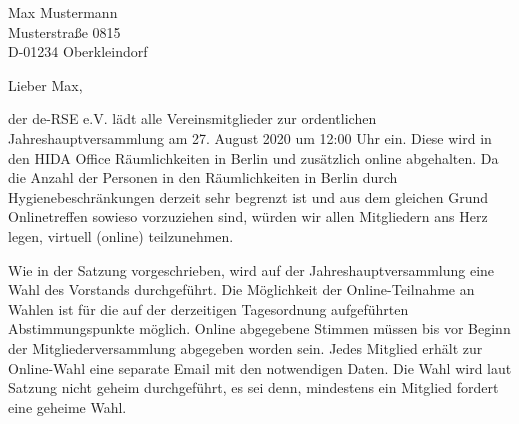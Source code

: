 \documentclass[../Vorlagen/de-RSE_Brief,a4paper]{scrlttr2}
\begin{document}

\begin{letter}{
    Max Mustermann\\
    Musterstraße 0815\\
    D-01234 Oberkleindorf
}
\opening{Lieber Max,}

der de-RSE e.V. lädt alle Vereinsmitglieder zur ordentlichen Jahreshauptversammlung am 27. August 2020 um 12:00 Uhr ein.
Diese wird in den HIDA Office Räumlichkeiten in Berlin und zusätzlich online abgehalten. Da die Anzahl der Personen in den Räumlichkeiten in Berlin durch Hygienebeschränkungen derzeit sehr begrenzt ist und aus dem gleichen Grund Onlinetreffen sowieso vorzuziehen sind, würden wir allen Mitgliedern ans Herz legen, virtuell (online) teilzunehmen.

Wie in der Satzung vorgeschrieben, wird auf der Jahreshauptversammlung eine Wahl des Vorstands durchgeführt.
Die Möglichkeit der Online-Teilnahme an Wahlen ist für die auf der derzeitigen Tagesordnung aufgeführten Abstimmungspunkte möglich.
Online abgegebene Stimmen müssen bis vor Beginn der Mitgliederversammlung abgegeben worden sein.
Jedes Mitglied erhält zur Online-Wahl eine separate Email mit den notwendigen Daten.
Die Wahl wird laut Satzung nicht geheim durchgeführt, es sei denn, mindestens ein Mitglied fordert eine geheime Wahl.


\end{letter}
\end{document}
